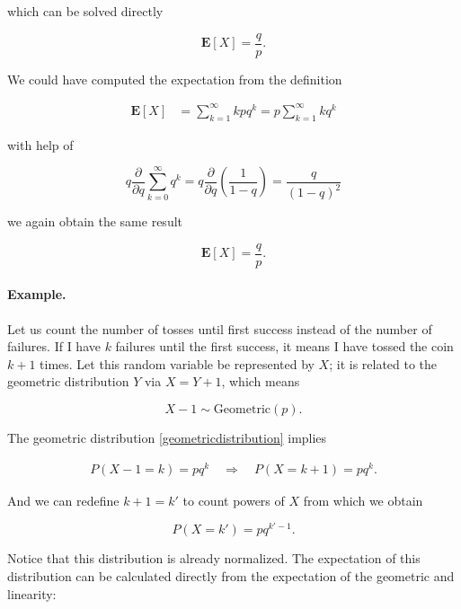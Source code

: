 \documentclass[12pt]{article}
\begin{document}
\noindent
which can be solved directly

\begin{equation}
\mathbf{E} [ X ] = \frac{q}{p}.
\end{equation}

We could have computed the expectation from the definition

\begin{align}
\mathbf{E} [ X ] &=
\sum_{k = 1}^{\infty}
k p q^{k} = 
p \sum_{k = 1}^{\infty} k q^{k}
\end{align}

\noindent
with help of

\begin{equation}
q \frac{\partial}{\partial q}
\sum_{k = 0}^{\infty} q^{k} =
q \frac{\partial}{\partial q}
\left( \frac{1}{1 - q} \right) =
\frac{q}{(1 - q)^{2}}
\end{equation}

\noindent
we again obtain the same result

\begin{equation}
\mathbf{E} [X] =
\frac{q}{p}.
\end{equation}

\paragraph{Example.}
Let us count the number of tosses until first success instead of the number of 
failures. If I have $k$ failures until the first success, it means I have tossed the coin $k + 1$ 
times. Let this random variable be represented by $X$; it is related to the geometric distribution 
$Y$ via $X = Y + 1$, which means 

\begin{equation}
X - 1 \sim \text{Geometric} (p).
\end{equation}

\noindent
The geometric distribution \eqref{geometricdistribution} implies

\begin{align}
P(X - 1 = k) = p q^{k}
\quad
\Rightarrow
\quad
P(X = k + 1) = p q^{k}.
\end{align}

\noindent
And we can redefine $k + 1 = k'$ to count powers of $X$ from which we obtain

\begin{equation}
P(X = k') = p q^{k' - 1}.
\end{equation}

\noindent
Notice that this distribution is already normalized.
The expectation of this distribution can be calculated directly from the
expectation of the geometric and linearity:
\end{document}
